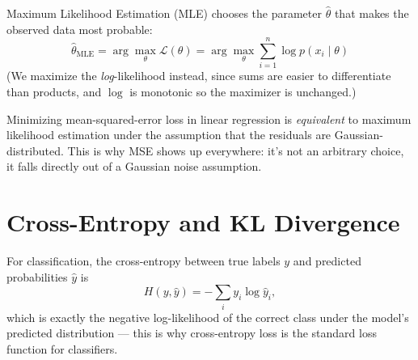 Maximum Likelihood Estimation (MLE) chooses the parameter $\hat\theta$ that
makes the observed data most probable:
\[
  \hat\theta_{\text{MLE}} = \arg\max_\theta \mathcal{L}(\theta) = \arg\max_\theta \sum_{i=1}^n \log p(x_i\mid\theta)
\]
(We maximize the \emph{log}-likelihood instead, since sums are easier to
differentiate than products, and $\log$ is monotonic so the maximizer is
unchanged.)


\begin{keyidea}
Minimizing mean-squared-error loss in linear regression is \emph{equivalent}
to maximum likelihood estimation under the assumption that the residuals
are Gaussian-distributed. This is why MSE shows up everywhere: it's not an
arbitrary choice, it falls directly out of a Gaussian noise assumption.
\end{keyidea}

\section{Cross-Entropy and KL Divergence}

For classification, the cross-entropy between true labels $y$ and
predicted probabilities $\hat y$ is
\[
  H(y,\hat y) = -\sum_i y_i \log \hat y_i,
\]
which is exactly the negative log-likelihood of the correct class under the
model's predicted distribution — this is why cross-entropy loss is the
standard loss function for classifiers.
